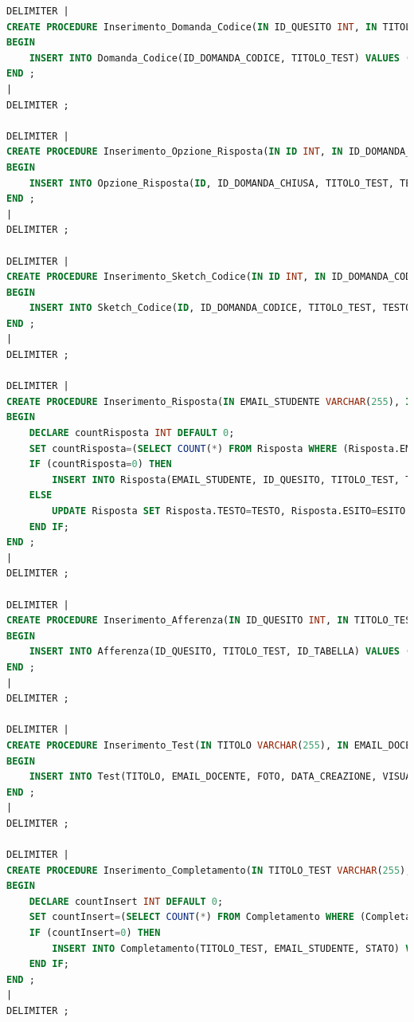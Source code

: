 \documentclass{article}
\begin{document}
\begin{lstlisting}[language=SQL, title=Codice SQL completo delle stored procedure dello schema della basi di dati.]
DELIMITER |
CREATE PROCEDURE Inserimento_Domanda_Codice(IN ID_QUESITO INT, IN TITOLO_TEST VARCHAR(255)) 
BEGIN
	INSERT INTO Domanda_Codice(ID_DOMANDA_CODICE, TITOLO_TEST) VALUES (ID_QUESITO, TITOLO_TEST);
END ;
| 
DELIMITER ;

DELIMITER |
CREATE PROCEDURE Inserimento_Opzione_Risposta(IN ID INT, IN ID_DOMANDA_CHIUSA INT, IN TITOLO_TEST VARCHAR(255), IN TESTO TEXT, IN SOLUZIONE BOOLEAN) 
BEGIN
	INSERT INTO Opzione_Risposta(ID, ID_DOMANDA_CHIUSA, TITOLO_TEST, TESTO, SOLUZIONE) VALUES (ID, ID_DOMANDA_CHIUSA, TITOLO_TEST, TESTO, SOLUZIONE);
END ;
| 
DELIMITER ;

DELIMITER |
CREATE PROCEDURE Inserimento_Sketch_Codice(IN ID INT, IN ID_DOMANDA_CODICE INT, IN TITOLO_TEST VARCHAR(255), IN TESTO TEXT, IN SOLUZIONE BOOLEAN) 
BEGIN
	INSERT INTO Sketch_Codice(ID, ID_DOMANDA_CODICE, TITOLO_TEST, TESTO, SOLUZIONE) VALUES (ID, ID_DOMANDA_CODICE, TITOLO_TEST, TESTO, SOLUZIONE);
END ;
| 
DELIMITER ;

DELIMITER |
CREATE PROCEDURE Inserimento_Risposta(IN EMAIL_STUDENTE VARCHAR(255), IN ID_QUESITO INT, IN TITOLO_TEST VARCHAR(255), IN TESTO TEXT, IN ESITO BOOLEAN) 
BEGIN
	DECLARE countRisposta INT DEFAULT 0;
	SET countRisposta=(SELECT COUNT(*) FROM Risposta WHERE (Risposta.EMAIL_STUDENTE=EMAIL_STUDENTE) AND (Risposta.ID_QUESITO=ID_QUESITO) AND (Risposta.TITOLO_TEST=TITOLO_TEST));
	IF (countRisposta=0) THEN
		INSERT INTO Risposta(EMAIL_STUDENTE, ID_QUESITO, TITOLO_TEST, TESTO, ESITO) VALUES (EMAIL_STUDENTE, ID_QUESITO, TITOLO_TEST, TESTO, ESITO);
	ELSE 
		UPDATE Risposta SET Risposta.TESTO=TESTO, Risposta.ESITO=ESITO WHERE (Risposta.EMAIL_STUDENTE=EMAIL_STUDENTE) AND (Risposta.ID_QUESITO=ID_QUESITO) AND (Risposta.TITOLO_TEST=TITOLO_TEST);
	END IF;
END ;
| 
DELIMITER ;

DELIMITER |
CREATE PROCEDURE Inserimento_Afferenza(IN ID_QUESITO INT, IN TITOLO_TEST VARCHAR(255), IN ID_TABELLA INT) 
BEGIN
	INSERT INTO Afferenza(ID_QUESITO, TITOLO_TEST, ID_TABELLA) VALUES (ID_QUESITO, TITOLO_TEST, ID_TABELLA);
END ;
| 
DELIMITER ;

DELIMITER |
CREATE PROCEDURE Inserimento_Test(IN TITOLO VARCHAR(255), IN EMAIL_DOCENTE VARCHAR(255), IN FOTO LONGBLOB, IN DATA_CREAZIONE DATE, IN VISUALIZZA_RISPOSTE BOOLEAN) 
BEGIN
	INSERT INTO Test(TITOLO, EMAIL_DOCENTE, FOTO, DATA_CREAZIONE, VISUALIZZA_RISPOSTE) VALUES (TITOLO, EMAIL_DOCENTE, FOTO, DATA_CREAZIONE, VISUALIZZA_RISPOSTE); 
END ;
| 
DELIMITER ;

DELIMITER |
CREATE PROCEDURE Inserimento_Completamento(IN TITOLO_TEST VARCHAR(255), IN EMAIL_STUDENTE VARCHAR(255)) 
BEGIN
	DECLARE countInsert INT DEFAULT 0;
	SET countInsert=(SELECT COUNT(*) FROM Completamento WHERE (Completamento.TITOLO_TEST=TITOLO_TEST) AND (Completamento.EMAIL_STUDENTE=EMAIL_STUDENTE));      
	IF (countInsert=0) THEN
		INSERT INTO Completamento(TITOLO_TEST, EMAIL_STUDENTE, STATO) VALUES (TITOLO_TEST, EMAIL_STUDENTE, 'APERTO'); 
	END IF;
END ;
| 
DELIMITER ;


\end{lstlisting}
\end{document}
